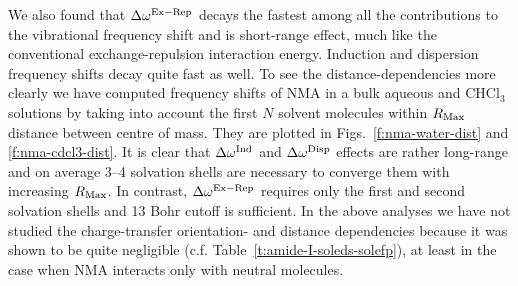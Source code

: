 \documentclass[a4paper,titlepage,twoside,fleqn,12pt]{book}
\begin{document}
\begin{refsection}
We also found that $\Delta\omega^{\rm Ex-Rep}$
decays the fastest among all the contributions to the vibrational frequency shift
and is short\hyp{}range effect, much like the conventional exchange\hyp{}repulsion interaction energy.
Induction and dispersion frequency shifts decay quite fast as well. To see the
distance\hyp{}dependencies more clearly we have computed frequency shifts
of NMA in a bulk aqueous and CHCl$_3$ solutions by taking into account
the first $N$ solvent molecules within $R_{\rm Max}$ distance between centre of
mass. They are plotted in Figs.~\ref{f:nma-water-dist} and \ref{f:nma-cdcl3-dist}. 
It is clear that $\Delta\omega^{\rm Ind}$
and $\Delta\omega^{\rm Disp}$ effects are rather long\hyp{}range
and on average 3--4 solvation shells are necessary to converge them with increasing $R_{\rm Max}$.
In contrast, $\Delta\omega^{\rm Ex-Rep}$ requires only the first and second solvation
shells and 13 Bohr cutoff is sufficient. In the above analyses we have not studied
the charge\hyp{}transfer orientation\hyp{} and distance dependencies
because it was shown to be quite negligible (c.f.
Table~\ref{t:amide-I-soleds-solefp}), at least in the case when
NMA interacts only with neutral molecules.

%


\end{refsection}
\end{document}
